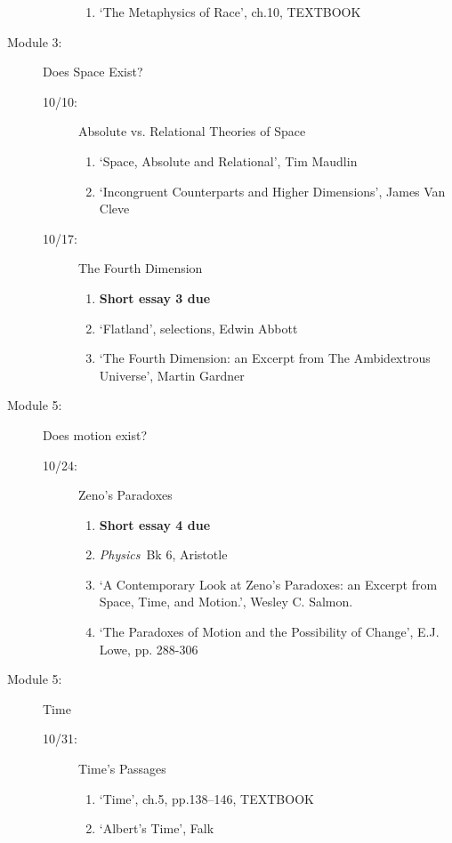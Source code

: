 \documentclass[article,oneside]{memoir}
\begin{document}
\begin{description}
\begin{description}
\begin{enumerate}
\item `The Metaphysics of Race', ch.10, TEXTBOOK

\end{enumerate}

\end{description}


\item[Module 3:] Does Space Exist? 
\begin{description}
\item[10/10:] Absolute vs. Relational Theories of Space
\begin{enumerate}
\item `Space, Absolute and Relational', Tim Maudlin
\item `Incongruent Counterparts and Higher Dimensions', James Van Cleve
\end{enumerate}

\item[10/17:] The Fourth Dimension
\begin{enumerate} 
\item \textbf{Short essay 3 due}
\item `Flatland', selections, Edwin Abbott 
\item `The Fourth Dimension: an Excerpt from The Ambidextrous Universe', Martin Gardner
\end{enumerate}
\end{description}

\item[Module 5:] Does motion exist? 
\begin{description}
\item [10/24:] Zeno's Paradoxes
\begin{enumerate}
\item \textbf{Short essay 4 due}
\item \emph{Physics}\ Bk 6, Aristotle
\item `A Contemporary Look at Zeno’s Paradoxes: an Excerpt from Space, Time, and Motion.', Wesley C. Salmon. 
\item `The Paradoxes of Motion and the Possibility of Change', E.J. Lowe, pp. 288-306
\end{enumerate}
\end{description}


\item[Module 5:] Time 
\begin{description}
\item [10/31:] Time's Passages
\begin{enumerate}
\item `Time', ch.5, pp.138--146, TEXTBOOK
\item `Albert's Time', Falk
\end{enumerate}


\end{description}
\end{description}
\end{document}
